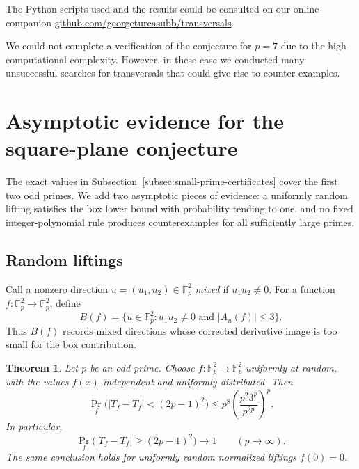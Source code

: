 \documentclass[reqno]{amsart}
\numberwithin{equation}{section}
\newtheorem{theorem}{Theorem}[section]
\theoremstyle{definition}
\begin{document}
 The Python scripts used and the results could be consulted on our online companion \url{github.com/georgeturcasubb/transversals}.

We could not complete a verification of the conjecture for $p=7$ due to the high computational complexity. However, in these case we conducted many unsuccessful searches for transversals that could give rise to counter-examples.



\section{Asymptotic evidence for the square-plane conjecture}
\label{sec:asymptotic-evidence}

The exact values in Subsection~\ref{subsec:small-prime-certificates} cover the
first two odd primes.  We add two asymptotic pieces of evidence: a uniformly
random lifting satisfies the box lower bound with probability tending to one,
and no fixed integer-polynomial rule produces counterexamples for all
sufficiently large primes.

\subsection{Random liftings}
\label{subsec:random-liftings}

Call a nonzero direction $u=(u_1,u_2)\in\mathbb F_p^2$ \emph{mixed} if
$u_1u_2\neq 0$.  For a function $f:\mathbb F_p^2\to\mathbb F_p^2$, define
\[
  B(f)=\{u\in\mathbb F_p^2:u_1u_2\neq 0\text{ and } |A_u(f)|\leq 3\}.
\]
Thus $B(f)$ records mixed directions whose corrected derivative image is too
small for the box contribution.

\begin{theorem}
\label{thm:random-square-plane-box-bound}
Let $p$ be an odd prime.  Choose $f:\mathbb F_p^2\to\mathbb F_p^2$ uniformly at
random, with the values $f(x)$ independent and uniformly distributed.  Then
\[
  \Pr_f\bigl(|T_f-T_f|<(2p-1)^2\bigr)
  \leq
  p^8\left(\frac{p^2 3^p}{p^{2p}}\right)^p.
\]
In particular,
\[
  \Pr_f\bigl(|T_f-T_f|\geq (2p-1)^2\bigr)\longrightarrow 1
  \qquad (p\to\infty).
\]
The same conclusion holds for uniformly random normalized liftings $f(0)=0$.
\end{theorem}
\end{document}
